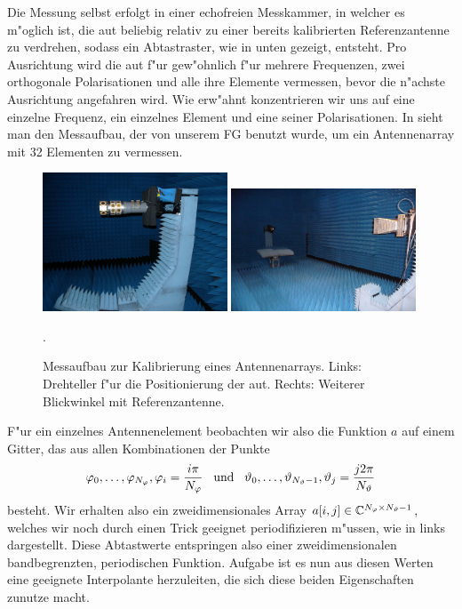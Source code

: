 Die Messung selbst erfolgt in einer echofreien Messkammer, in welcher es m"oglich ist, die \gls{aut} beliebig relativ zu einer bereits kalibrierten Referenzantenne zu verdrehen, sodass ein Abtastraster, wie in  unten gezeigt, entsteht.
Pro Ausrichtung wird die \gls{aut} f"ur gew"ohnlich f"ur mehrere Frequenzen, zwei orthogonale Polarisationen und alle ihre Elemente vermessen, bevor die n"achste Ausrichtung angefahren wird.
Wie erw"ahnt konzentrieren wir uns auf eine einzelne Frequenz, ein einzelnes Element und eine seiner Polarisationen.
In  sieht man den Messaufbau, der von unserem FG benutzt wurde, um ein Antennenarray mit 32 Elementen zu vermessen.

\begin{figure}[t]
    \centering\includegraphics[width=0.49\textwidth]{img/eadf/anechoic1.png}
    \includegraphics[width=0.49\textwidth]{img/eadf/anechoic2.png}
    \caption{Messaufbau zur Kalibrierung eines Antennenarrays. Links: Drehteller f"ur die Positionierung der \gls{aut}. Rechts: Weiterer Blickwinkel mit Referenzantenne.}\label{fig:eadf:anechoic}.
\end{figure}

F"ur ein einzelnes Antennenelement beobachten wir also die Funktion $a$ auf einem Gitter, das aus allen Kombinationen der Punkte 
\[
    \varphi_0, \dots, \varphi_{N_\varphi}, \varphi_i = \frac{i \pi}{N_\varphi}
    {\hspace{3mm} \text{und} \hspace{3mm}}
    \vartheta_0, \dots, \vartheta_{N_\vartheta-1}, \vartheta_j = \frac{j 2 \pi}{N_\vartheta}
\]
besteht.
Wir erhalten also ein zweidimensionales Array $a[i,j] \in \mathbb{C}^{N_\varphi \times N_\vartheta - 1}$, welches wir noch durch einen Trick geeignet periodifizieren m"ussen, wie in  links dargestellt.
Diese Abtastwerte entspringen also einer zweidimensionalen bandbegrenzten, periodischen Funktion.
Aufgabe ist es nun aus diesen Werten eine geeignete Interpolante herzuleiten, die sich diese beiden Eigenschaften zunutze macht.
%
%
%
%
%
%
